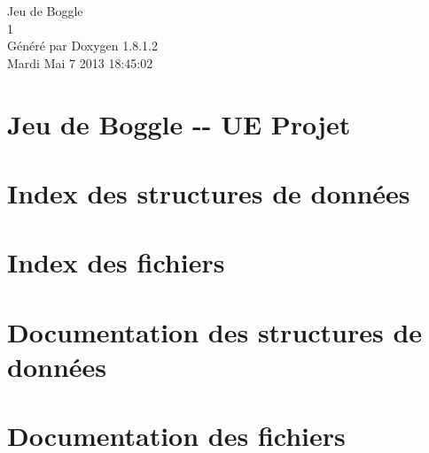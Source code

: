 \documentclass{book}
\begin{document}
\hypersetup{pageanchor=false,citecolor=blue}
\begin{titlepage}
\vspace*{7cm}
\begin{center}
{\Large Jeu de Boggle \\[1ex]\large 1 }\\
\vspace*{1cm}
{\large Généré par Doxygen 1.8.1.2}\\
\vspace*{0.5cm}
{\small Mardi Mai 7 2013 18:45:02}\\
\end{center}
\end{titlepage}
\clearemptydoublepage
{}
\tableofcontents
\clearemptydoublepage
{}
\hypersetup{pageanchor=true,citecolor=blue}
\chapter{Jeu de Boggle -\/-\/ U\-E Projet}
\label{index}\hypertarget{index}{}
\chapter{Index des structures de données}

\chapter{Index des fichiers}

\chapter{Documentation des structures de données}





\chapter{Documentation des fichiers}


















\printindex
\end{document}
